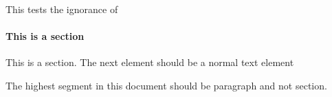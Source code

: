 This tests the ignorance of \sectioning


\paragraph{This is a section}
This is a section. The next element should be a normal text element

\sectioning

The highest segment in this document should be paragraph and not section.


